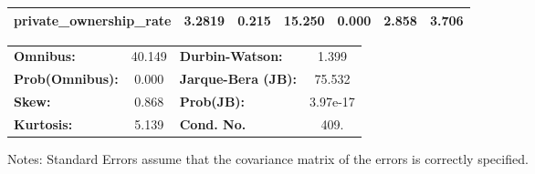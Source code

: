 \begin{center}
\begin{tabular}{lcccccc}
\textbf{private\_ownership\_rate} &       3.2819  &        0.215     &    15.250  &         0.000        &        2.858    &        3.706     \\
\bottomrule
\end{tabular}
\begin{tabular}{lclc}
\textbf{Omnibus:}       & 40.149 & \textbf{  Durbin-Watson:     } &    1.399  \\
\textbf{Prob(Omnibus):} &  0.000 & \textbf{  Jarque-Bera (JB):  } &   75.532  \\
\textbf{Skew:}          &  0.868 & \textbf{  Prob(JB):          } & 3.97e-17  \\
\textbf{Kurtosis:}      &  5.139 & \textbf{  Cond. No.          } &     409.  \\
\bottomrule
\end{tabular}
\end{center}

Notes: \newline
 [1] Standard Errors assume that the covariance matrix of the errors is correctly specified.
